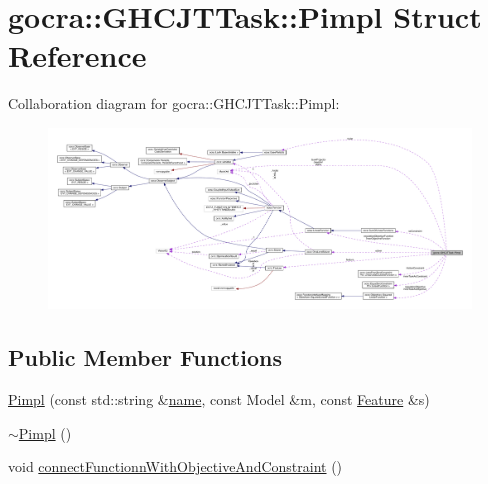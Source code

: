 \hypertarget{structgocra_1_1GHCJTTask_1_1Pimpl}{}\section{gocra\+:\+:G\+H\+C\+J\+T\+Task\+:\+:Pimpl Struct Reference}
\label{structgocra_1_1GHCJTTask_1_1Pimpl}


Collaboration diagram for gocra\+:\+:G\+H\+C\+J\+T\+Task\+:\+:Pimpl\+:\nopagebreak
\begin{figure}[H]
\begin{center}
\leavevmode
\includegraphics[width=350pt]{d8/daf/structgocra_1_1GHCJTTask_1_1Pimpl__coll__graph}
\end{center}
\end{figure}
\subsection*{Public Member Functions}
\begin{DoxyCompactItemize}
\item 
\hyperlink{structgocra_1_1GHCJTTask_1_1Pimpl_ad413aad5c0e13b459b10d16dc91c8579}{Pimpl} (const std\+::string \&\hyperlink{structgocra_1_1GHCJTTask_1_1Pimpl_a62bf1c09164be6cf8a48360bd6e53d64}{name}, const Model \&m, const \hyperlink{classocra_1_1Feature}{Feature} \&s)
\item 
\hyperlink{structgocra_1_1GHCJTTask_1_1Pimpl_a40a8c393004df9cb06d2cacf7a60b55f}{$\sim$\+Pimpl} ()
\item 
void \hyperlink{structgocra_1_1GHCJTTask_1_1Pimpl_aeedb4e2ac7e5dc4b68655b124ee8ed58}{connect\+Functionn\+With\+Objective\+And\+Constraint} ()
\end{DoxyCompactItemize}
